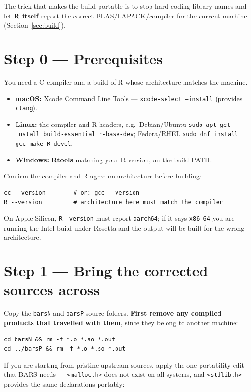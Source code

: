 \documentclass[11pt]{article}
\begin{document}
The trick that makes the build portable is to stop hard-coding library names and
let \textbf{R itself} report the correct BLAS/LAPACK/compiler for the current
machine (Section~\ref{sec:build}).

\section{Step 0 --- Prerequisites}

You need a C compiler and a build of R whose architecture matches the machine.

\begin{itemize}[leftmargin=1.4em]
  \item \textbf{macOS:} Xcode Command Line Tools --- \texttt{xcode-select --install}
        (provides \texttt{clang}).
  \item \textbf{Linux:} the compiler and R headers, e.g.\ Debian/Ubuntu
        \texttt{sudo apt-get install build-essential r-base-dev}; Fedora/RHEL
        \texttt{sudo dnf install gcc make R-devel}.
  \item \textbf{Windows:} \textbf{Rtools} matching your R version, on the build PATH.
\end{itemize}

Confirm the compiler and R agree on architecture before building:

\begin{lstlisting}
cc --version        # or: gcc --version
R --version         # architecture here must match the compiler
\end{lstlisting}

On Apple Silicon, \texttt{R --version} must report \texttt{aarch64}; if it says
\texttt{x86\_64} you are running the Intel build under Rosetta and the output will
be built for the wrong architecture.

\section{Step 1 --- Bring the corrected sources across}

Copy the \texttt{barsN} and \texttt{barsP} source folders. \textbf{First remove any
compiled products that travelled with them}, since they belong to another machine:

\begin{lstlisting}
cd barsN && rm -f *.o *.so *.out
cd ../barsP && rm -f *.o *.so *.out
\end{lstlisting}

If you are starting from pristine upstream sources, apply the one portability edit
that BARS needs --- \texttt{<malloc.h>} does not exist on all systems, and
\texttt{<stdlib.h>} provides the same declarations portably:
\end{document}

